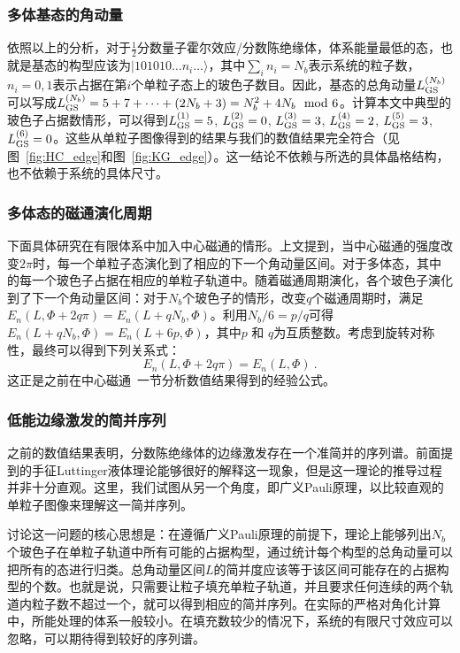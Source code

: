 \subsubsection{多体基态的角动量}
依照以上的分析，对于$\frac{1}{2}$分数量子霍尔效应/分数陈绝缘体，体系能量最低的态，也就是基态的构型应该为$|101010 \ldots n_i \ldots \rangle$，其中$\sum_i n_i =N_b $表示系统的粒子数，$n_i = 0, 1$表示占据在第$i$个单粒子态上的玻色子数目。因此，基态的总角动量$L_{\rm GS}^{(N_b)}$可以写成$L_{\rm GS}^{(N_b)} = 5+7+\dots+(2N_b+3) = N_b^2 + 4N_b \mod 6$。计算本文中典型的玻色子占据数情形，可以得到$L_{\rm GS}^{(1)} = 5$, $L_{\rm GS}^{(2)} = 0$, $L_{\rm GS}^{(3)} = 3$, $L_{\rm GS}^{(4)} = 2$, $L_{\rm GS}^{(5)} = 3$, $L_{\rm GS}^{(6)} = 0$。这些从单粒子图像得到的结果与我们的数值结果完全符合（见图~\ref{fig:HC_edge}和图~\ref{fig:KG_edge}）。这一结论不依赖与所选的具体晶格结构，也不依赖于系统的具体尺寸。


\subsubsection{多体态的磁通演化周期}
下面具体研究在有限体系中加入中心磁通的情形。上文提到，当中心磁通的强度改变$2\pi$时，每一个单粒子态演化到了相应的下一个角动量区间。对于多体态，其中的每一个玻色子占据在相应的单粒子轨道中。随着磁通周期演化，各个玻色子演化到了下一个角动量区间：对于$N_b$个玻色子的情形，改变$q$个磁通周期时，满足$E_n(L,\Phi+2q\pi)=E_n(L+qN_b,\Phi)$。利用$N_b/6=p/q$可得$E_n(L+qN_b,\Phi)=E_n(L+6p,\Phi)$，其中$p$ 和 $q$为互质整数。考虑到旋转对称性，最终可以得到下列关系式：
\[E_n(L,\Phi+2q\pi)=E_n(L,\Phi)~.\]
这正是之前在中心磁通~\pageref{sec:flux}一节分析数值结果得到的经验公式。


\subsubsection{低能边缘激发的简并序列}
之前的数值结果表明，分数陈绝缘体的边缘激发存在一个准简并的序列谱。前面提到的手征Luttinger液体理论能够很好的解释这一现象，但是这一理论的推导过程并非十分直观。这里，我们试图从另一个角度，即广义Pauli原理，以比较直观的单粒子图像来理解这一简并序列。

讨论这一问题的核心思想是：在遵循广义Pauli原理的前提下，理论上能够列出$N_b$个玻色子在单粒子轨道中所有可能的占据构型，通过统计每个构型的总角动量可以把所有的态进行归类。总角动量区间$L$的简并度应该等于该区间可能存在的占据构型的个数。也就是说，只需要让粒子填充单粒子轨道，并且要求任何连续的两个轨道内粒子数不超过一个，就可以得到相应的简并序列。在实际的严格对角化计算中，所能处理的体系一般较小。在填充数较少的情况下，系统的有限尺寸效应可以忽略，可以期待得到较好的序列谱。

